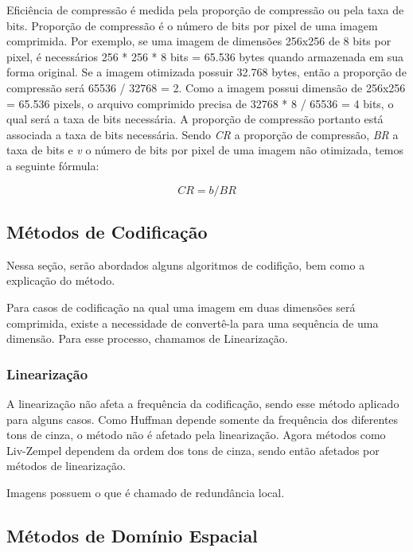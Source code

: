 Eficiência de compressão é medida pela proporção de compressão ou pela taxa de bits. Proporção de compressão é o número de bits por pixel de uma imagem comprimida. Por exemplo, se uma imagem de dimensões 256x256 de 8 bits por pixel, é necessários 256 * 256 * 8 bits = 65.536 bytes quando armazenada em sua forma original. Se a imagem otimizada possuir 32.768 bytes, então a proporção de compressão será 65536 / 32768 = 2. Como a imagem possui dimensão de 256x256 = 65.536 pixels, o arquivo comprimido precisa de 32768 * 8 / 65536 = 4 bits, o qual será a taxa de bits necessária. A proporção de compressão portanto está associada a taxa de bits necessária. Sendo {\em CR} a proporção de compressão, {\em BR} a taxa de bits e {\em v} o número de bits por pixel de uma imagem não otimizada, temos a seguinte fórmula:

\[ CR = b / BR \]

\subsection{Métodos de Codificação}
\label{ss.codingmethod}

Nessa seção, serão abordados alguns algoritmos de codifição, bem como a explicação do método.

Para casos de codificação na qual uma imagem em duas dimensões será comprimida, existe a necessidade de convertê-la para uma sequência de uma dimensão. Para esse processo, chamamos de Linearização.

\subsubsection{Linearização}
\label{sss.linearlization}

A linearização não afeta a frequência da codificação, sendo esse método aplicado para alguns casos. Como Huffman depende somente da frequência dos diferentes tons de cinza, o método não é afetado pela linearização. Agora métodos como Liv-Zempel dependem da ordem dos tons de cinza, sendo então afetados por métodos de linearização.

Imagens possuem o que é chamado de redundância local.

\subsection{Métodos de Domínio Espacial}
\label{ss.spacialmethod}

